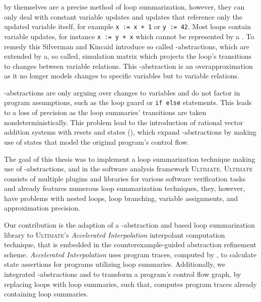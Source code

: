 \qvasr by themselves are a precise method of loop summarization, however, they can only deal with constant variable updates and updates that reference only the updated variable itself, for example \texttt{x := x + 1} or \texttt{y := 42}. Most loops contain variable updates, for instance \texttt{x := y + x} which cannot be represented by a \qvasr. To remedy this Silverman and Kincaid introduce so called \qvasr-abstractions, which are \qvasr extended by a, so called, simulation matrix which projects the loop's transitions to changes between variable relations. This \qvasr-abstraction is an overapproximation as it no longer models changes to specific variables but to variable relations.\par
\qvasr-abstractions are only arguing over changes to variables and do not factor in program assumptions, such as the loop guard or \texttt{if else} statements. This leads to a loss of precision as the loop summaries' transitions are taken nondeterministically. This problem lead to the introduction of rational vector addition systems with resets and states (\qvasr), which expand \qvasr-abstractions by making use of states that model the original program's control flow.\par
The goal of this thesis was to implement a loop summarization technique making use of \qvasr-abstractions, and \qvasrs in the software analysis framework \textsc{Ultimate}\cite{Zitat02}.
\textsc{Ultimate} consists of multiple plugins and libraries for various software verification tasks and already features numerous loop summarization techniques, they, however, have problems with nested loops, loop branching, variable assignments, and approximation precision.\par
Our contribution is the adaption of a \qvasr-abstraction and \qvasrs based loop summarization library to \textsc{Ultimate}'s \textsl{Accelerated Interpolation} interpolant computation technique, that is embedded in the \traceabstraction \cite{10.1007/978-3-642-03237-0_7} counterexample-guided abstraction refinement scheme. \textsl{Accelerated Interpolation} uses program traces, computed by \traceabstraction, to calculate state assertions for programs utilizing loop summaries. Additionally, we integrated \qvasr-abstractions and \qvasrs to transform a program's control flow graph, by replacing loops with loop summaries, such that, \traceabstraction computes program traces already containing loop summaries.\par

